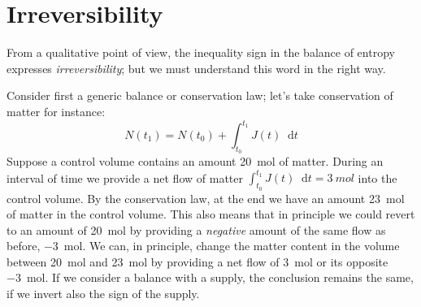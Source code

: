 \documentclass[a4paper,12pt,%
onecolumn,oneside,%
british%
]{memoir}
\newcommand*{\di}{\mathop{}\!\mathrm{d}}%
\renewcommand*{\|}[1][]{\nonscript\:#1\vert\nonscript\:\mathopen{}}
\newcommand*{\yti}{t_{0}}
\newcommand*{\ytf}{t_{1}}
\newcommand*{\dt}{\di t}
\newcommand*{\yN}{N}
\newcommand*{\yJ}{J}
\begin{document}
\section{Irreversibility}
\label{sec:irreversibility}

From a qualitative point of view, the inequality sign in the balance of entropy expresses \emph{irreversibility}; but we must understand this word in the right way.

Consider first a generic balance or conservation law; let's take conservation of matter for instance:
\begin{equation*}
  \yN(\ytf) = \yN(\yti) + \int_{\yti}^{\ytf}\!\!\yJ(t)\dt
\end{equation*}
%
Suppose a control volume contains an amount \qty{20}{mol} of matter. During an interval of time we provide a net flow of matter $\int_{\yti}^{\ytf}\!\!\yJ(t)\dt = \qty{3}{mol}$ into the control volume. By the conservation law, at the end we have an amount \qty{23}{mol} of matter in the control volume. This also means that in principle we could revert to an amount of \qty{20}{mol} by providing a \emph{negative} amount of the same flow as before, \qty{-3}{mol}. We can, in principle, change the matter content in the volume between \qty{20}{mol} and \qty{23}{mol} by providing a net flow of \qty{+3}{mol} or its opposite \qty{-3}{mol}. If we consider a balance with a supply, the conclusion remains the same, if we invert also the sign of the supply.
\end{document}
